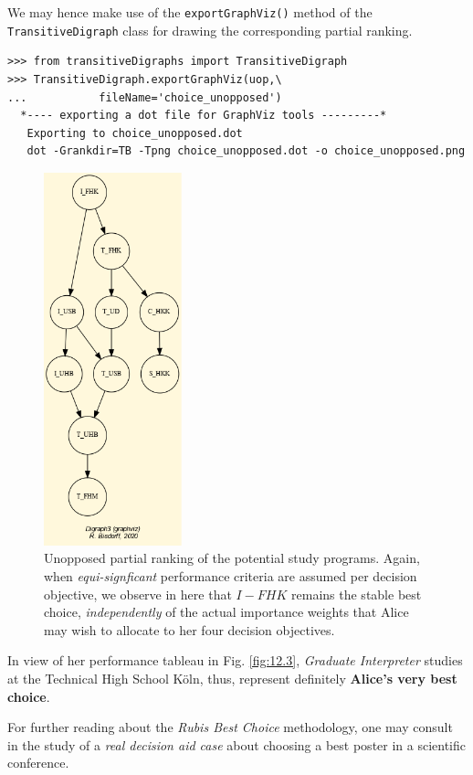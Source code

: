 We may hence make use of the \texttt{exportGraphViz()} method of the\\ \texttt{TransitiveDigraph} class for drawing the corresponding partial ranking.
\begin{lstlisting}
>>> from transitiveDigraphs import TransitiveDigraph
>>> TransitiveDigraph.exportGraphViz(uop,\
...           fileName='choice_unopposed')
  *---- exporting a dot file for GraphViz tools ---------*
   Exporting to choice_unopposed.dot
   dot -Grankdir=TB -Tpng choice_unopposed.dot -o choice_unopposed.png
\end{lstlisting}
\begin{figure}[h]
\sidecaption
\includegraphics[width=4cm]{Figures/AliceChoice_unopposed.png}
\caption{Unopposed partial ranking of the potential study programs. Again, when \emph{equi-signficant} performance criteria are assumed per decision objective, we observe in here that $I-FHK$ remains the stable best choice, \emph{independently} of the actual importance weights that Alice may wish to allocate to her four decision objectives.}
\label{fig:12.7}       %
\end{figure}
\clearpage
In view of her performance tableau in Fig. \ref{fig:12.3}, \emph{Graduate Interpreter} studies at the Technical High School Köln, thus, represent definitely \textbf{Alice's very best choice}.

For further reading about the \emph{Rubis Best Choice} methodology, one may consult in \citep{BIS-2015} the study of a \emph{real decision aid case} about choosing a best poster in a scientific conference.
 
\clearpage


%